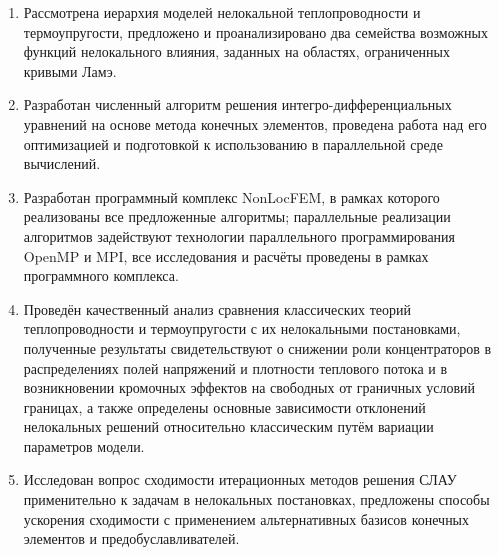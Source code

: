 \begin{enumerate}
	\item Рассмотрена иерархия моделей нелокальной теплопроводности и термоупругости, предложено и проанализировано два семейства возможных функций нелокального влияния, заданных на областях, ограниченных кривыми Ламэ.
	
	\item Разработан численный алгоритм решения интегро-дифференциальных уравнений на основе метода конечных элементов, проведена работа над его оптимизацией и подготовкой к использованию в параллельной среде вычислений.
	
	\item Разработан программный комплекс NonLocFEM, в рамках которого реализованы все предложенные алгоритмы; параллельные реализации алгоритмов задействуют технологии параллельного программирования OpenMP и MPI, все исследования и расчёты проведены в рамках программного комплекса.
	
	\item Проведён качественный анализ сравнения классических теорий теплопроводности и термоупругости с их нелокальными постановками, полученные результаты свидетельствуют о снижении роли концентраторов в распределениях полей напряжений и плотности теплового потока и в возникновении кромочных эффектов на свободных от граничных условий границах, а также определены основные зависимости отклонений нелокальных решений относительно классическим путём вариации параметров модели.
	
	\item Исследован вопрос сходимости итерационных методов решения СЛАУ применительно к задачам в нелокальных постановках, предложены способы ускорения сходимости с применением альтернативных базисов конечных элементов и предобуславливателей.
\end{enumerate}
